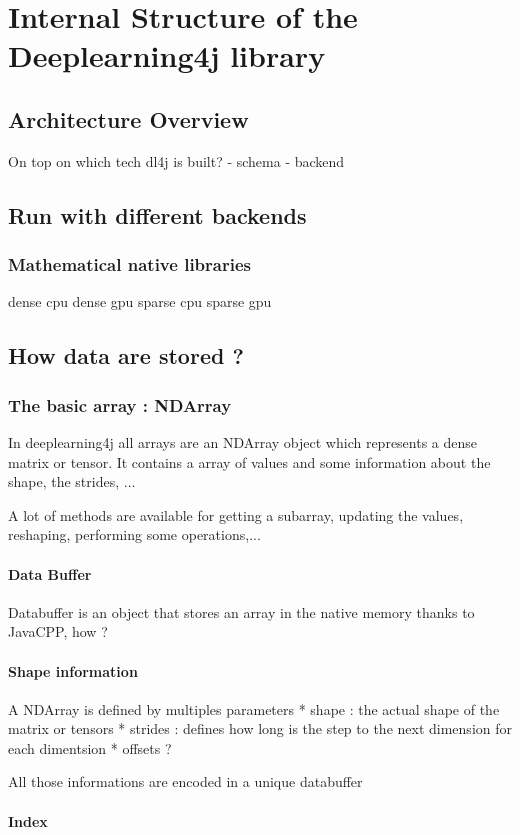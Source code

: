\chapter{Internal Structure of the Deeplearning4j library}

\section{Architecture Overview}

On top on which tech dl4j is built? - schema - backend

\section{Run with different backends}
\subsection{Mathematical native libraries}
dense cpu
dense gpu
sparse cpu
sparse gpu

\section{How data are stored ?}
\subsection{The basic array : NDArray}
In deeplearning4j all arrays are an NDArray object which represents a dense matrix or tensor. It contains a array of values and some information about the shape, the strides, ...

A lot of methods are available for getting a subarray, updating the values, reshaping, performing some operations,...

\subsubsection{Data Buffer}
Databuffer is an object that stores an array in the native memory thanks to JavaCPP, how ?

\subsubsection{Shape information}
A NDArray is defined by multiples parameters
* shape : the actual shape of the matrix or tensors
* strides : defines how long is the step to the next dimension for each dimentsion
* offsets ?

All those informations are encoded in a unique databuffer

\subsubsection{Index}
